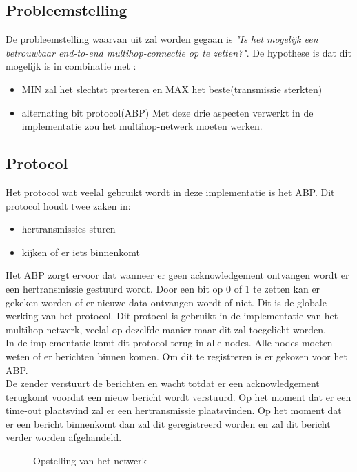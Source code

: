 \documentclass{article}
\begin{document}
\subsection{Probleemstelling}

De probleemstelling waarvan uit zal worden gegaan is \textit{"Is het mogelijk een betrouwbaar end-to-end multihop-connectie op te zetten?"}. De hypothese is dat dit mogelijk is in combinatie met :
\\
\begin{itemize}
	\item MIN zal het slechtst presteren en MAX het beste(transmissie sterkten)
	\item alternating bit protocol(ABP)
	Met deze drie aspecten verwerkt in de implementatie zou het multihop-netwerk moeten werken. 
\end{itemize}
\subsection{Protocol}
Het protocol wat veelal gebruikt wordt in deze implementatie is het ABP. Dit protocol houdt twee zaken in:
\\
\begin{itemize}
	\item hertransmissies sturen
	\item kijken of er iets binnenkomt
\end{itemize}
Het ABP zorgt ervoor dat wanneer er geen acknowledgement ontvangen wordt er een hertransmissie gestuurd wordt. Door een bit op 0 of 1 te zetten kan er gekeken worden of er nieuwe data ontvangen wordt of niet. Dit is de globale werking van het protocol. Dit protocol is gebruikt in de implementatie van het multihop-netwerk, veelal op dezelfde manier maar dit zal toegelicht worden. 
\\ 
In de implementatie komt dit protocol terug in alle nodes.
Alle nodes moeten weten of er berichten binnen komen. Om dit te registreren is er gekozen voor het ABP.\\

De zender verstuurt de berichten en wacht totdat er een acknowledgement terugkomt voordat een nieuw bericht wordt verstuurd. Op het moment dat er een time-out plaatsvind zal er een hertransmissie plaatsvinden. Op het moment dat er een bericht binnenkomt dan zal dit geregistreerd worden en zal dit bericht verder worden afgehandeld.

\begin{figure}
\centering 
{} 
\caption{Opstelling van het netwerk}
\label{fig:hop} %
\end{figure}
\end{document}
